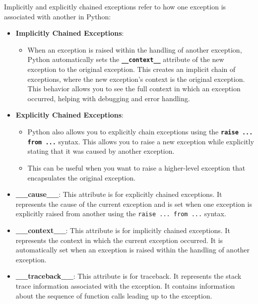 Implicitly and explicitly chained exceptions refer to how one exception is associated with another in Python:

\begin{itemize}
    \item \textbf{Implicitly Chained Exceptions}:
    \begin{itemize}
        \item When an exception is raised within the handling of another exception, Python automatically sets the \textbf{\texttt{\_\_context\_\_}} attribute of the new exception to the original exception. This creates an implicit chain of exceptions, where the new exception's context is the original exception. This behavior allows you to see the full context in which an exception occurred, helping with debugging and error handling.
    \end{itemize}

    \item \textbf{Explicitly Chained Exceptions}:
    \begin{itemize}
        \item Python also allows you to explicitly chain exceptions using the \textbf{\texttt{raise ... from ...}} syntax. This allows you to raise a new exception while explicitly stating that it was caused by another exception.
        \item This can be useful when you want to raise a higher-level exception that encapsulates the original exception.
    \end{itemize}
\end{itemize}


\begin{itemize}
    \item \textbf{\_\_cause\_\_}: This attribute is for explicitly chained exceptions. It represents the cause of the current exception and is set when one exception is explicitly raised from another using the \texttt{raise ... from ...} syntax.
    
    \item \textbf{\_\_context\_\_}: This attribute is for implicitly chained exceptions. It represents the context in which the current exception occurred. It is automatically set when an exception is raised within the handling of another exception.
    
    \item \textbf{\_\_traceback\_\_}: This attribute is for traceback. It represents the stack trace information associated with the exception. It contains information about the sequence of function calls leading up to the exception.
\end{itemize}

